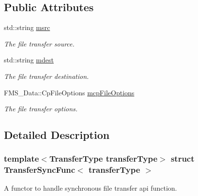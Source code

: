 \subsection*{Public Attributes}
\begin{DoxyCompactItemize}
\item 
\hypertarget{structTransferSyncFunc_a969474b34d199b28ba82c2cb7d5560d6}{
std::string \hyperlink{structTransferSyncFunc_a969474b34d199b28ba82c2cb7d5560d6}{msrc}}
\label{structTransferSyncFunc_a969474b34d199b28ba82c2cb7d5560d6}

\begin{DoxyCompactList}\small\item\em The file transfer source. \item\end{DoxyCompactList}\item 
\hypertarget{structTransferSyncFunc_a0712e3d7a30e42ee200b3af880598471}{
std::string \hyperlink{structTransferSyncFunc_a0712e3d7a30e42ee200b3af880598471}{mdest}}
\label{structTransferSyncFunc_a0712e3d7a30e42ee200b3af880598471}

\begin{DoxyCompactList}\small\item\em The file transfer destination. \item\end{DoxyCompactList}\item 
\hypertarget{structTransferSyncFunc_ad5e9d66585584c247d72bfa45a9ad960}{
FMS\_\-Data::CpFileOptions \hyperlink{structTransferSyncFunc_ad5e9d66585584c247d72bfa45a9ad960}{mcpFileOptions}}
\label{structTransferSyncFunc_ad5e9d66585584c247d72bfa45a9ad960}

\begin{DoxyCompactList}\small\item\em The file transfer options. \item\end{DoxyCompactList}\end{DoxyCompactItemize}


\subsection{Detailed Description}
\subsubsection*{template$<$TransferType transferType$>$ struct TransferSyncFunc$<$ transferType $>$}

A functor to handle synchronous file transfer api function. 

